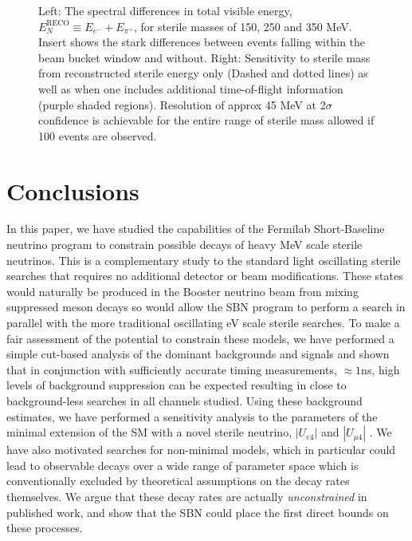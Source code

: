 \documentclass[11pt, a4paper]{article}
\begin{document}
\begin{figure}[t]
\caption{\label{fig:tof_scatter}Left: The spectral differences in total visible energy, $E_N^\text{RECO} \equiv E_{e^-}+E_{\pi^+}$, for sterile masses of 150, 250 and 350 MeV. Insert shows the stark differences between events falling within the beam bucket window and without.  Right: Sensitivity to sterile mass from reconstructed sterile energy only (Dashed and dotted lines) as well as when one includes additional time-of-flight information (purple shaded regions). Resolution of approx 45 MeV at 2$\sigma$ confidence is achievable for the entire range of sterile mass allowed if 100 events are observed. }

\end{figure}



\section{\label{sec:conclusions}Conclusions}

In this paper, we have studied the capabilities of the Fermilab Short-Baseline
neutrino program to constrain possible decays of heavy MeV scale sterile neutrinos. This is a complementary study to the standard light oscillating sterile searches that requires no additional detector or beam modifications. These states would naturally be produced in the Booster neutrino beam from mixing suppressed meson decays so would allow the SBN program to perform a search in parallel with the more traditional oscillating eV scale sterile searches. To make a fair assessment of the potential to constrain these models, we have performed a simple cut-based analysis of the dominant
backgrounds and signals and shown that in conjunction with sufficiently accurate timing
measurements, $\approx 1$ns, high levels of background suppression can be expected resulting in
close to background-less searches in all channels studied. Using these
background estimates, we have performed a sensitivity analysis to the
parameters of the minimal extension of the SM with a novel sterile neutrino, $|U_{e4}|$ and $|U_{\mu4}|$ .
We have also motivated searches for non-minimal models, which in
particular could lead to observable decays over a wide range of parameter space
which is conventionally excluded by theoretical assumptions on the decay rates
themselves. We argue that these decay rates are actually \emph{unconstrained}
in published work, and show that the SBN could place the first direct bounds on
these processes. 

\acknowledgments
\end{document}

